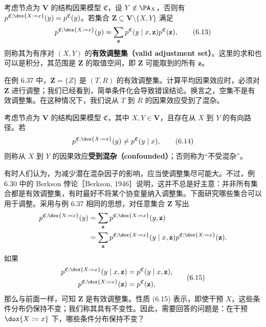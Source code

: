 \begin{definition}[有效调整集]
考虑节点为 $\mathbf V$ 的结构因果模型 $\mathfrak C$，设 $Y\notin\PA_X$，否则有 $p^{\mathfrak C;\dox{X:=x}}(y)=p^{\mathfrak C}(y)$。若集合 $\mathbf Z\subseteq\mathbf V\setminus\{X,Y\}$ 满足
\begin{equation}
 p^{\mathfrak C;\dox{X:=x}}(y)
 =\sum_{\mathbf z}p^{\mathfrak C}(y\mid x,\mathbf z)p^{\mathfrak C}(\mathbf z),
 \tag{6.13}
\end{equation}
则称其为有序对 $(X,Y)$ 的\textbf{有效调整集（valid adjustment set）}。这里的求和也可以是积分，其范围是 $\mathbf Z$ 的取值空间，即 $\mathbf Z$ 可能取到的所有 $\mathbf z$。
\end{definition}

在例 6.37 中，$\mathbf Z=\{Z\}$ 是 $(T,R)$ 的有效调整集。计算平均因果效应时，必须对 $\mathbf Z$ 进行调整；我们已经看到，简单条件化会导致错误结论。换言之，空集不是有效调整集。在这种情况下，我们说从 $T$ 到 $R$ 的因果效应受到了混杂。

\begin{definition}[混杂]
考虑节点为 $\mathbf V$ 的结构因果模型 $\mathfrak C$，其中 $X,Y\in\mathbf V$，且存在从 $X$ 到 $Y$ 的有向路径。若
\begin{equation}
 p^{\mathfrak C;\dox{X:=x}}(y)\ne p^{\mathfrak C}(y\mid x),
 \tag{6.14}
\end{equation}
则称从 $X$ 到 $Y$ 的因果效应\textbf{受到混杂（confounded）}；否则称为“不受混杂”。
\end{definition}

有时人们认为，为减少潜在混杂因子的影响，应当使调整集尽可能大。不过，例 6.30 中的 Berkson 悖论［Berkson, 1946］说明，这并不总是好主意：并非所有集合都是有效调整集，有时最好不将某个协变量纳入调整集。下面研究哪些集合可以用于调整。采用与例 6.37 相同的思想，对任意集合 $\mathbf Z$ 写出
\[
 \begin{aligned}
 p^{\mathfrak C;\dox{X:=x}}(y)
 &=\sum_{\mathbf z}p^{\mathfrak C;\dox{X:=x}}(y,\mathbf z)\\
 &=\sum_{\mathbf z}p^{\mathfrak C;\dox{X:=x}}(y\mid x,\mathbf z)
 p^{\mathfrak C;\dox{X:=x}}(\mathbf z).
 \end{aligned}
\]
如果
\begin{equation}
 \begin{aligned}
 p^{\mathfrak C;\dox{X:=x}}(y\mid x,\mathbf z)
 &=p^{\mathfrak C}(y\mid x,\mathbf z),\\
 p^{\mathfrak C;\dox{X:=x}}(\mathbf z)&=p^{\mathfrak C}(\mathbf z),
 \end{aligned}
 \tag{6.15}
\end{equation}
那么与前面一样，可知 $\mathbf Z$ 是有效调整集。性质 (6.15) 表示，即使干预 $X$，这些条件分布仍保持不变；我们称其具有不变性。因此，需要回答的问题是：在干预 $\dox{X:=x}$ 下，哪些条件分布保持不变？
